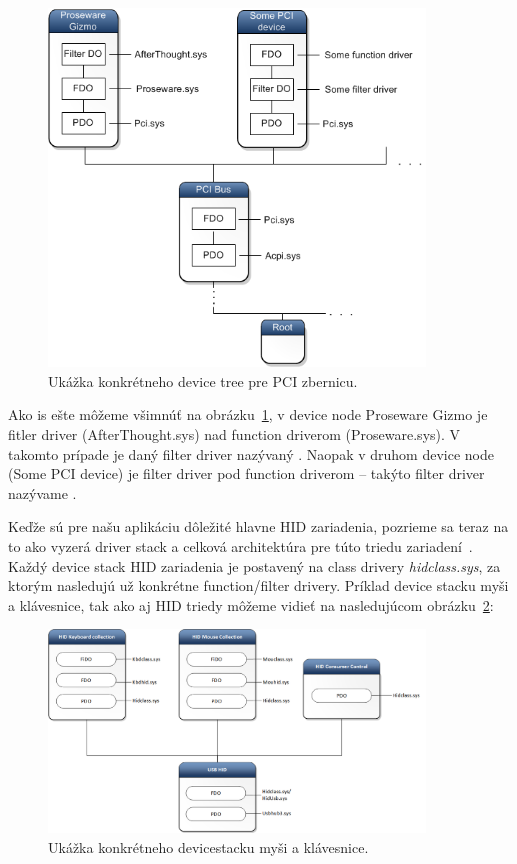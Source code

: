 \begin{itemize}
\begin{figure}[!htb]
	\centering
	\includegraphics[width=10cm]{img/kap02_concrete_dev_tree}
	\caption{Ukážka konkrétneho device tree pre PCI zbernicu.}
	\label{obr:kap2:concrete_dev_tree}
\end{figure}

\end{itemize}


Ako is ešte môžeme všimnúť na obrázku~\ref{obr:kap2:concrete_dev_tree}, v device node Proseware Gizmo je fitler driver (AfterThought.sys) nad function driverom (Proseware.sys). V takomto prípade je daný filter driver nazývaný . Naopak v druhom device node (Some PCI device) je filter driver pod function driverom -- takýto filter driver nazývame .

Keďže sú pre našu aplikáciu dôležité hlavne HID zariadenia, pozrieme sa teraz na to ako vyzerá driver stack a celková architektúra pre túto triedu zariadení~\label{kap02:sec:hid_arch}. Každý device stack HID zariadenia je postavený na class drivery \textit{hidclass.sys}, za ktorým nasledujú už konkrétne function/filter drivery. Príklad device stacku myši a klávesnice, tak ako aj HID triedy môžeme vidieť na nasledujúcom obrázku~\ref{obr:kap2:concrete_dev_stack}:

\begin{figure}[!htb]
	\centering
	\includegraphics[width=10cm]{img/kap02_concrete_device_stack}
	\caption{Ukážka konkrétneho devicestacku myši a klávesnice.}
	\label{obr:kap2:concrete_dev_stack}
\end{figure}

